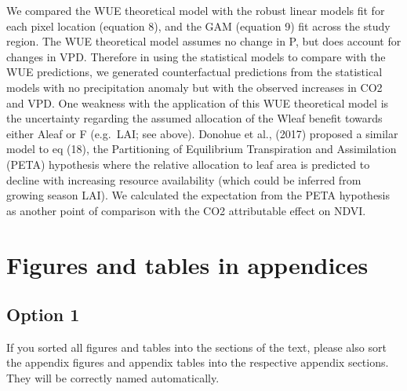 \documentclass[gc, manuscript]{copernicus}
\begin{document}
We compared the WUE theoretical model with the robust linear models fit
for each pixel location (equation 8), and the GAM (equation 9) fit
across the study region. The WUE theoretical model assumes no change in
P, but does account for changes in VPD. Therefore in using the
statistical models to compare with the WUE predictions, we generated
counterfactual predictions from the statistical models with no
precipitation anomaly but with the observed increases in CO2 and VPD.
One weakness with the application of this WUE theoretical model is the
uncertainty regarding the assumed allocation of the Wleaf benefit
towards either Aleaf or F (e.g.~LAI; see above). Donohue et al., (2017)
proposed a similar model to eq (18), the Partitioning of Equilibrium
Transpiration and Assimilation (PETA) hypothesis where the relative
allocation to leaf area is predicted to decline with increasing resource
availability (which could be inferred from growing season LAI). We
calculated the expectation from the PETA hypothesis as another point of
comparison with the CO2 attributable effect on NDVI.

\conclusions[Conclusions]







\appendix
\section{Figures and tables in appendices}
\subsection{Option 1}

If you sorted all figures and tables into the sections of the text,
please also sort the appendix figures and appendix tables into the
respective appendix sections. They will be correctly named
automatically.
\end{document}
